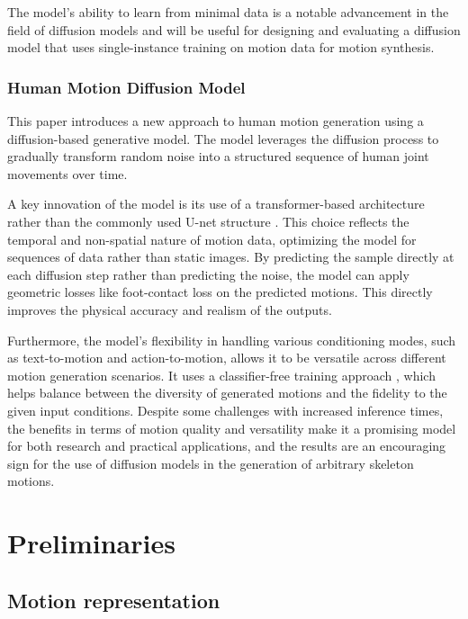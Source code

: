 \documentclass[a4paper, 12pt]{report}
\begin{document}
The model's ability to learn from minimal data is a notable advancement in the field of diffusion models and will be useful for designing and evaluating a diffusion model that uses single-instance training on motion data for motion synthesis.

\subsection{Human Motion Diffusion Model}
This paper \cite{tevet_human_2022} introduces a new approach to human motion generation using a diffusion-based generative model. The model leverages the diffusion process to gradually transform random noise into a structured sequence of human joint movements over time.

A key innovation of the model is its use of a transformer-based architecture \cite{vaswani_attention_2023} rather than the commonly used U-net structure \cite{ronneberger_u-net_2015}. This choice reflects the temporal and non-spatial nature of motion data, optimizing the model for sequences of data rather than static images. By predicting the sample directly at each diffusion step rather than predicting the noise, the model can apply geometric losses like foot-contact loss on the predicted motions. This directly improves the physical accuracy and realism of the outputs.

Furthermore, the model's flexibility in handling various conditioning modes, such as text-to-motion and action-to-motion, allows it to be versatile across different motion generation scenarios. It uses a classifier-free training approach \cite{ho_classifier-free_2022}, which helps balance between the diversity of generated motions and the fidelity to the given input conditions. Despite some challenges with increased inference times, the benefits in terms of motion quality and versatility make it a promising model for both research and practical applications, and the results are an encouraging sign for the use of diffusion models in the generation of arbitrary skeleton motions.

\chapter{Preliminaries}

\section{Motion representation}
\end{document}
